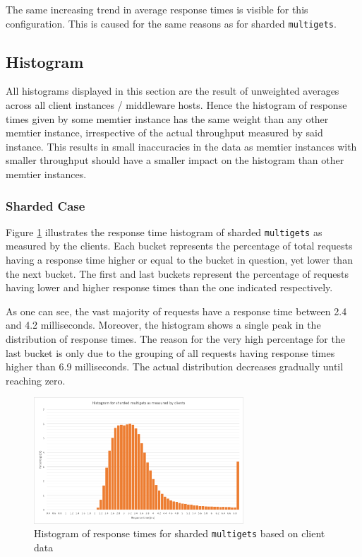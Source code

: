 \documentclass[11pt,a4paper]{article}
\begin{document}
The same increasing trend in average response times is visible for this configuration. This is caused for the same reasons as for sharded \texttt{multigets}.

\subsection{Histogram}
All histograms displayed in this section are the result of unweighted averages across all client instances / middleware hosts. Hence the histogram of response times given by some memtier instance has the same weight than any other memtier instance, irrespective of the actual throughput measured by said instance. This results in small inaccuracies in the data as memtier instances with smaller throughput should have a smaller impact on the histogram than other memtier instances.

\subsubsection{Sharded Case}
Figure \ref{png::get_and_multigets_hist_sharded_clients} illustrates the response time histogram of sharded \texttt{multigets} as measured by the clients. Each bucket represents the percentage of total requests having a response time higher or equal to the bucket in question, yet lower than the next bucket. The first and last buckets represent the percentage of requests having lower and higher response times than the one indicated respectively.

As one can see, the vast majority of requests have a response time between 2.4 and 4.2 milliseconds. Moreover, the histogram shows a single peak in the distribution of response times. The reason for the very high percentage for the last bucket is only due to the grouping of all requests having response times higher than 6.9 milliseconds. The actual distribution decreases gradually until reaching zero.

\begin{figure}[!h]
    \centering
    \includegraphics[width=0.7\textwidth]{processing/graphics/get_and_multigets_hist_sharded_clients.png}
    \caption{Histogram of response times for sharded \texttt{multigets} based on client data}
    \label{png::get_and_multigets_hist_sharded_clients}
\end{figure}
\end{document}
